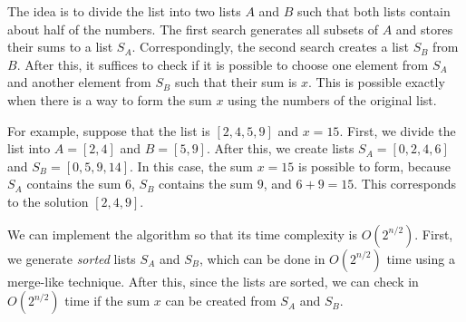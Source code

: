 The idea is to divide the list into
two lists $A$ and $B$ such that both
lists contain about half of the numbers.
The first search generates all subsets
of $A$ and stores their sums to a list $S_A$.
Correspondingly, the second search creates
a list $S_B$ from $B$.
After this, it suffices to check if it is possible
to choose one element from $S_A$ and another
element from $S_B$ such that their sum is $x$.
This is possible exactly when there is a way to
form the sum $x$ using the numbers of the original list.

For example, suppose that the list is $[2,4,5,9]$ and $x=15$.
First, we divide the list into $A=[2,4]$ and $B=[5,9]$.
After this, we create lists
$S_A=[0,2,4,6]$ and $S_B=[0,5,9,14]$.
In this case, the sum $x=15$ is possible to form,
because $S_A$ contains the sum $6$,
$S_B$ contains the sum $9$, and $6+9=15$.
This corresponds to the solution $[2,4,9]$.

We can implement the algorithm so that
its time complexity is $O(2^{n/2})$.
First, we generate \emph{sorted} lists $S_A$ and $S_B$,
which can be done in $O(2^{n/2})$ time using a merge-like technique.
After this, since the lists are sorted,
we can check in $O(2^{n/2})$ time if
the sum $x$ can be created from $S_A$ and $S_B$.

